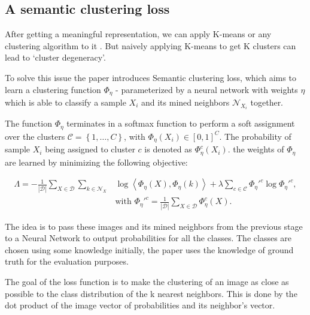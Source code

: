\subsection{A semantic clustering loss} 

After getting a meaningful representation, we can apply K-means or any clustering algorithm to it . But naively applying K-means to get K clusters can lead to ‘cluster degeneracy’.

To solve this issue the paper introduces Semantic clustering loss, which aims to learn a clustering function $\Phi_\eta$ - parameterized by a neural network with weights $\eta$ which is able to classify a sample $X_i$ and its mined neighbors $\mathcal{N}_{X_i}$ together. 

The function $\Phi_\eta$ terminates in a softmax function to perform a soft assignment over the clusters $\mathcal{C}=\left\{1,\ldots,C\right\}$, with $\Phi_\eta \left(X_i\right) \in [0,1]^C$. The probability of sample $X_i$ being assigned to cluster $c$ is denoted as $\Phi_\eta^c(X_i)$. the weights of $\Phi_\eta$ are learned by minimizing the following objective:

\begin{equation}
\label{eq:loss_objective}
\begin{split}
\Lambda = -\frac{1}{|\mathcal{D}|}\sum\limits_{X\in\mathcal{D}}\sum\limits_{k\in\mathcal{N}_{X}}&\log\left<\Phi_\eta(X),\Phi_\eta(k)\right> + \lambda\sum_{c\in\mathcal{C}} \Phi_\eta'^c \log \Phi_\eta'^c, \\
&\text{with~} \Phi_\eta'^c = \frac{1}{|\mathcal{D}|}\sum\limits_{X\in\mathcal{D}}\Phi_\eta^c(X).
\end{split}
\end{equation}





The idea is to pass these images and its mined neighbors from the previous stage to a Neural Network to output probabilities for all the classes. The classes are chosen using some knowledge initially, the paper uses the knowledge of ground truth for the evaluation purposes.  


\medskip

The goal of the loss function is to make the clustering of an image as close as possible to the class distribution of the k nearest neighbors.
This is done by the dot product of the image vector of probabilities and its neighbor’s vector. 







